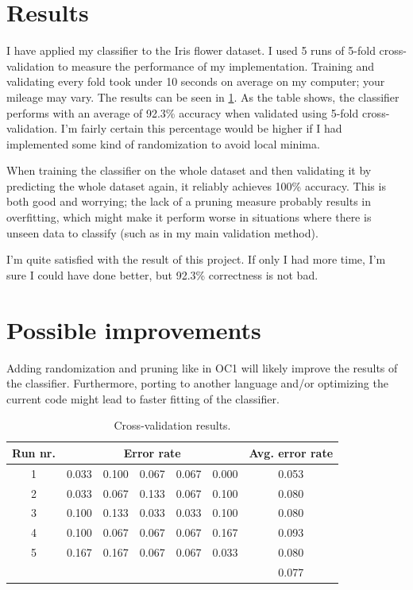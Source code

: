 \documentclass[12pt]{article}
\begin{document}
\section{Results}
I have applied my classifier to the Iris flower dataset. I used 5 runs of 5-fold cross-validation to measure the performance of my implementation. Training and validating every fold took under 10 seconds on average on my computer; your mileage may vary. The results can be seen in \cref{tab:cvresults}. As the table shows, the classifier performs with an average of 92.3\% accuracy when validated using 5-fold cross-validation. I'm fairly certain this percentage would be higher if I had implemented some kind of randomization to avoid local minima.

When training the classifier on the whole dataset and then validating it by predicting the whole dataset again, it reliably achieves 100\% accuracy. This is both good and worrying; the lack of a pruning measure probably results in overfitting, which might make it perform worse in situations where there is unseen data to classify (such as in my main validation method).

I'm quite satisfied with the result of this project. If only I had more time, I'm sure I could have done better, but 92.3\% correctness is not bad.

\section{Possible improvements}
Adding randomization and pruning like in OC1 will likely improve the results of the classifier. Furthermore, porting to another language and/or optimizing the current code might lead to faster fitting of the classifier.

\begin{table}[!ht]
\centering
\begin{tabular}{c|cccccc}
Run nr. & \multicolumn{5}{c}{Error rate} & Avg. error rate \\ \hline
1 & 0.033 & 0.100 & 0.067 & 0.067 & 0.000 & 0.053 \\
2 & 0.033 & 0.067 & 0.133 & 0.067 & 0.100 & 0.080 \\
3 & 0.100 & 0.133 & 0.033 & 0.033 & 0.100 & 0.080 \\
4 & 0.100 & 0.067 & 0.067 & 0.067 & 0.167 & 0.093 \\
5 & 0.167 & 0.167 & 0.067 & 0.067 & 0.033 & 0.080 \\ \hline
~ & ~     & ~     & ~     & ~     & ~     & 0.077
\end{tabular}
\caption{Cross-validation results.}
\label{tab:cvresults}
\end{table}
\end{document}

